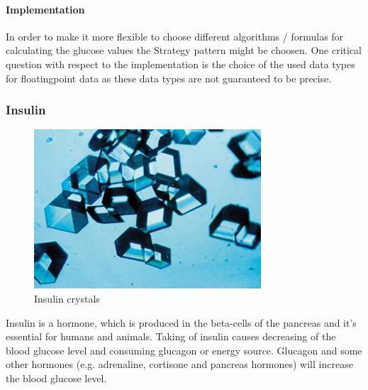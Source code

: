 \newpage
\paragraph{Implementation}
In order to make it more flexible to choose different algorithms / formulas for
calculating the glucose values the Strategy pattern might be choosen. One
critical question with respect to the implementation is the choice of the used
data types for floatingpoint data as these data types are not guaranteed to be precise.

\newpage
\subsubsection{Insulin}
\begin{figure}[htb]
\centering
\includegraphics[scale=0.4]{images/Insulincrystals.jpg}
\caption{Insulin crystals}
\end{figure}
Insulin is a hormone, which is produced in the beta-cells of the pancreas and it's essential for humans and animals. 
Taking of insulin causes decreasing of the blood glucose level and consuming glucagon or energy source. 
Glucagon and some other hormones (e.g. adrenaline, cortisone and pancreas hormones) will increase the blood glucose level.\\

